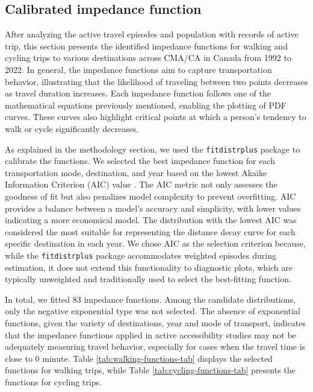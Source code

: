 \documentclass[preprint, 3p,
authoryear]{elsarticle} %
\begin{document}
\subsection{Calibrated impedance
function}\label{calibrated-impedance-function}

After analyzing the active travel episodes and population with records
of active trip, this section presents the identified impedance functions
for walking and cycling trips to various destinations across CMA/CA in
Canada from 1992 to 2022. In general, the impedance functions aim to
capture transportation behavior, illustrating that the likelihood of
traveling between two points decreases as travel duration increases.
Each impedance function follows one of the mathematical equations
previously mentioned, enabling the plotting of PDF curves. These curves
also highlight critical points at which a person's tendency to walk or
cycle significantly decreases.

As explained in the methodology section, we used the
\texttt{fitdistrplus} package \citep{delignette2015fitdistrplus} to
calibrate the functions. We selected the best impedance function for
each transportation mode, destination, and year based on the lowest
Akaike Information Criterion (AIC) value \citep{akaike1974}. The AIC
metric not only assesses the goodness of fit but also penalizes model
complexity to prevent overfitting. AIC provides a balance between a
model's accuracy and simplicity, with lower values indicating a more
economical model. The distribution with the lowest AIC was considered
the most suitable for representing the distance decay curve for each
specific destination in each year. We chose AIC as the selection
criterion because, while the \texttt{fitdistrplus} package accommodates
weighted episodes during estimation, it does not extend this
functionality to diagnostic plots, which are typically unweighted and
traditionally used to select the best-fitting function.

In total, we fitted 83 impedance functions. Among the candidate
distributions, only the negative exponential type was not selected. The
absence of exponential functions, given the variety of destinations,
year and mode of transport, indicates that the impedance functions
applied in active accessibility studies may not be adequately measuring
travel behavior, especially for cases when the travel time is close to 0
minute. Table \ref{tab:walking-functions-tab} displays the selected
functions for walking trips, while Table \ref{tab:cycling-functions-tab}
presents the functions for cycling trips.
\end{document}
